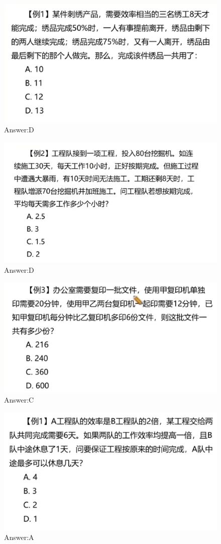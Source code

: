 \documentclass{article}
\numberwithin{equation}{section}						%
\numberwithin{figure}{section}							%
\begin{document}
\begin{sloppypar}
\begin{figure}[H]
     \centering
     \includegraphics[width=0.6\linewidth]{266.png}
		\caption{Answer:D}
\end{figure}


\begin{figure}[H]
     \centering
     \includegraphics[width=0.6\linewidth]{267.png}
		\caption{Answer:D}
\end{figure}

\begin{figure}[H]
     \centering
     \includegraphics[width=0.6\linewidth]{268.png}
		\caption{Answer:C}
\end{figure}

 
\begin{figure}[H]
     \centering
     \includegraphics[width=0.6\linewidth]{269.png}
		\caption{Answer:A}
\end{figure}



\end{sloppypar}
\end{document}
